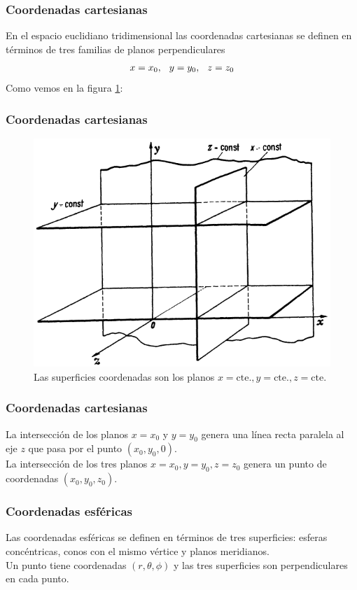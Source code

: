 \documentclass[12pt]{beamer}
\begin{document}
\begin{frame}
\frametitle{Coordenadas cartesianas}
En el espacio euclidiano tridimensional las coordenadas cartesianas se definen en términos de tres familias de planos perpendiculares 
\begin{align*}
x = x_{0}, \hspace{0.25cm} y = y_{0}, \hspace{0.25cm} z = z_{0}
\end{align*}
\pause
Como vemos en la figura \ref{fig:figura_planos_cartesianos}:
\end{frame}
\begin{frame}
\frametitle{Coordenadas cartesianas}
\begin{figure}[h!]
   \centering
   \includegraphics[scale=1.3]{Imagenes/Planos_Coordenadas_Cartesianas.png}
   \caption{Las superficies coordenadas son los planos $x=\mbox{cte.}, y=\mbox{cte.}, z=\mbox{cte.}$}
   \label{fig:figura_planos_cartesianos}
\end{figure}
\end{frame}
\begin{frame}
\frametitle{Coordenadas cartesianas}
La intersección de los planos $x = x_{0}$ y $y = y_{0}$ genera una línea recta paralela al eje $z$
que pasa por el punto $(x_{0}, y_{0}, 0)$.
\\
\bigskip
\pause
La intersección de los tres planos $x = x_{0}, y = y_{0}, z = z_{0}$ genera un punto de coordenadas $(x_{0}, y_{0}, z_{0})$.
\end{frame}
\begin{frame}
\frametitle{Coordenadas esféricas}
Las coordenadas esféricas se definen en términos de tres superficies: esferas concéntricas, conos con el mismo vértice y planos meridianos.
\\
\bigskip
\pause
Un punto tiene coordenadas $(r, \theta, \phi)$ y las tres superficies son perpendiculares en cada punto.
\end{frame}
\end{document}
